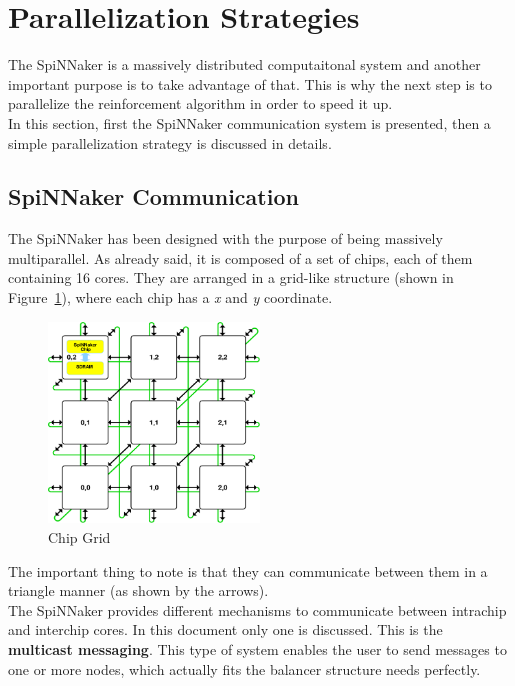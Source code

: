 \documentclass{article}
\begin{document}
\section{Parallelization Strategies}
The SpiNNaker is a massively distributed computaitonal system and another important purpose is to take advantage of that. This is why the next step is to parallelize the reinforcement algorithm in order to speed it up.\\
In this section, first the SpiNNaker communication system is presented, then a simple parallelization strategy is discussed in details.


\subsection{SpiNNaker Communication}
The SpiNNaker has been designed with the purpose of being massively multiparallel. As already said, it is composed of a set of chips, each of them containing 16 cores. They are arranged in a grid-like structure (shown in Figure~\ref{fig:grid}), where each chip has a \textit{x} and \textit{y} coordinate. 

\begin{figure}[h]
\begin{center}
\includegraphics[width=0.5\textwidth]{grid}
\caption{Chip Grid}
\label{fig:grid}
\end{center}
\end{figure}

The important thing to note is that they can communicate between them in a triangle manner (as shown by the arrows).\\

The SpiNNaker provides different mechanisms to communicate between intrachip and interchip cores. In this document only one is discussed. This is the \textbf{multicast messaging}. This type of system enables the user to send messages to one or more nodes, which actually fits the balancer structure needs perfectly.\\
\end{document}
